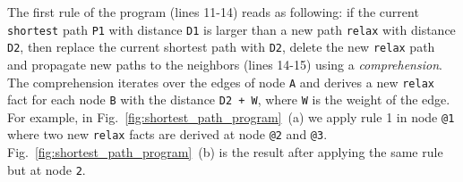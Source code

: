 \begin{dblfig}[ht]
\begin{center}
  \hspace{0.4cm}
  \hspace{0.4cm}
\end{center}
\end{dblfig}


The first rule of the program (lines 11-14) reads as following: if the current
\texttt{shortest} path \texttt{P1} with distance \texttt{D1} is larger
than a new path \texttt{relax} with distance \texttt{D2}, then replace the
current shortest path with \texttt{D2}, delete the new \texttt{relax} path and
propagate new paths to the neighbors (lines 14-15) using a \emph{comprehension}.
The comprehension iterates over the edges of node \texttt{A} and derives a new
\texttt{relax} fact for each node \texttt{B} with the distance \texttt{D2 + W},
where \texttt{W} is the weight of the edge. For
example, in Fig.~\ref{fig:shortest_path_program}~(a) we apply rule 1 in node
\texttt{@1} where two new \texttt{relax} facts are derived at node \texttt{@2}
and \texttt{@3}. Fig.~\ref{fig:shortest_path_program}~(b) is the result after
applying the same rule but at node \texttt{2}.

